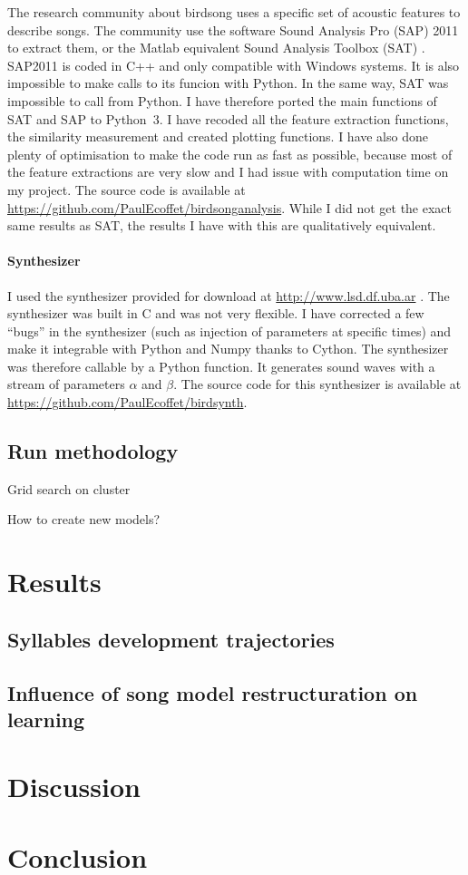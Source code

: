 \documentclass{report}
\begin{document}
The research community about birdsong uses a specific set of acoustic features
to describe songs. The community use the software Sound Analysis Pro (SAP) 2011
to extract them, or the Matlab equivalent Sound Analysis Toolbox (SAT)
\parencite{tchernichovski_procedure_2000}. SAP2011 is coded in C++ and only
compatible with Windows systems. It is also impossible to make calls to its
funcion with Python. In the same way, SAT was impossible to call from Python. I
have therefore ported the main functions of SAT and SAP to Python~3. I have
recoded all the feature extraction functions, the similarity measurement and
created plotting functions. I have also done plenty of optimisation to make the
code run as fast as possible, because most of the feature extractions are very
slow and I had issue with computation time on my project. The source code is
available at \url{https://github.com/PaulEcoffet/birdsonganalysis}. While I did
not get the exact same results as SAT, the results I have with this are
qualitatively equivalent. 

\subsubsection{Synthesizer}

I used the synthesizer provided for download at \url{http://www.lsd.df.uba.ar}
\parencite{boari_automatic_2015}. The synthesizer was built in C and was not
very flexible. I have corrected a few ``bugs'' in the synthesizer (such as
injection of parameters at specific times) and make it integrable with Python
and Numpy thanks to Cython. The synthesizer was therefore callable by a Python
function. It generates sound waves with a stream of parameters $\alpha$ and
$\beta$. The source code for this synthesizer is available at
\url{https://github.com/PaulEcoffet/birdsynth}.

\section{Run methodology}

Grid search on cluster

How to create new models?



\chapter{Results}

\section{Syllables development trajectories}

\section{Influence of song model restructuration on learning}

\chapter{Discussion}

\chapter{Conclusion}

\printbibliography{}
\end{document}
